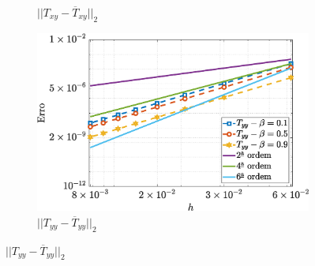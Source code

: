 \begin{figure}[H]
\begin{subfigure}[b]{.47\textwidth}
        \caption{$||T_{xy} - \overline{T}_{xy}||_{2}$}
        \label{error_txy_2nd_Case1_oldorydb}
    \end{subfigure}
    \qquad
    \begin{subfigure}[b]{.47\textwidth}
        \includegraphics[width=\textwidth]{figures/Case12/OldroydB/Errors/NormErr_2nd_Re_100_Wi_1_epsilon_0_xi_0_alphaG_0_Dt_1e-06_at_0.05_tipsim_1_MMS_12_Tyy.eps}
        \caption{$||T_{yy} - \overline{T}_{yy}||_{2}$}
        \label{error_tyy_2nd_Case1_oldorydb}
    \end{subfigure}
    \fdadospesquisa
\end{figure}

